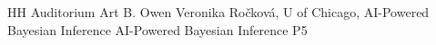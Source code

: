 {HH Auditorium}	%
{Art B. Owen}		%
{Veronika Ročková, U of Chicago, AI-Powered Bayesian Inference}	%
{AI-Powered Bayesian Inference}		%
{P5}		%
\\\hline
